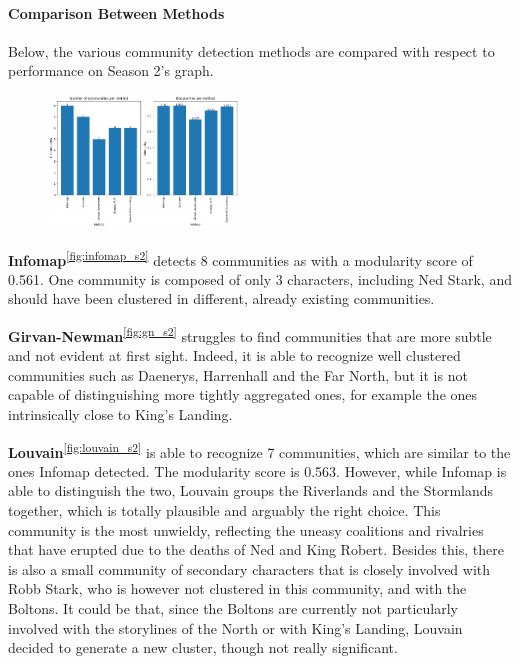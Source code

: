 \documentclass[10pt,twocolumn,letterpaper]{article}
\begin{document}
\paragraph{Comparison Between Methods}

Below, the various community detection methods are compared with respect to performance on Season 2's graph.

\begin{figure}[!h]
    \centering
    \includegraphics[width=0.45\textwidth]{img/s2/communities_comparison.jpg} \\
    \label{fig:comm_comp_s2}
\end{figure}

\textbf{Infomap}\textsuperscript{\ref{fig:infomap_s2}} detects 8 communities as with a modularity score of 0.561. One community is composed of only 3 characters, including Ned Stark, and should have been clustered in different, already existing communities. 

\textbf{Girvan-Newman}\textsuperscript{\ref{fig:gn_s2}} struggles to find communities that are more subtle and not evident at first sight. Indeed, it is able to recognize well clustered communities such as Daenerys, Harrenhall and the Far North, but it is not capable of distinguishing more tightly aggregated ones, for example the ones intrinsically close to King's Landing.

\textbf{Louvain}\textsuperscript{\ref{fig:louvain_s2}} is able to recognize 7 communities, which are similar to the ones Infomap detected. The modularity score is 0.563. However, while Infomap is able to distinguish the two, Louvain groups the Riverlands and the Stormlands together, which is totally plausible and arguably the right choice. This community is the most unwieldy, reflecting the uneasy coalitions and rivalries that have erupted due to the deaths of Ned and King Robert. 
Besides this, there is also a small community of secondary characters that is closely involved with Robb Stark, who is however not clustered in this community, and with the Boltons. It could be that, since the Boltons are currently not particularly involved with the storylines of the North or with King's Landing, Louvain decided to generate a new cluster, though not really significant.
\end{document}

